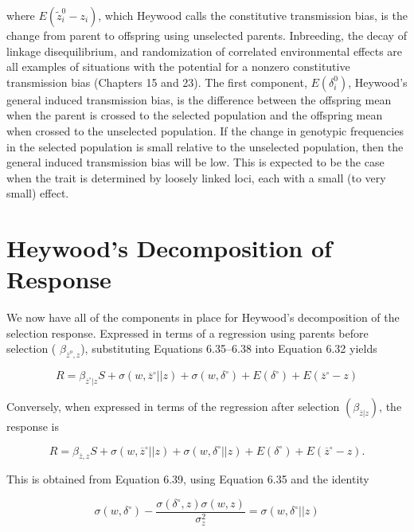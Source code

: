 \documentclass{article}
\begin{document}
where  $ E(\tilde{z}_i^0 - z_i) $, which Heywood calls the constitutive transmission bias, is the change from parent to offspring using unselected parents. Inbreeding, the decay of linkage disequilibrium, and randomization of correlated environmental effects are all examples of situations with the potential for a nonzero constitutive transmission bias (Chapters 15 and 23). The first component,  $ E(\delta_i^0) $, Heywood's general induced transmission bias, is the difference between the offspring mean when the parent is crossed to the selected population and the offspring mean when crossed to the unselected population. If the change in genotypic frequencies in the selected population is small relative to the unselected population, then the general induced transmission bias will be low. This is expected to be the case when the trait is determined by loosely linked loci, each with a small (to very small) effect.

\section{Heywood's Decomposition of Response}
We now have all of the components in place for Heywood's decomposition of the selection response. Expressed in terms of a regression using parents before selection ( $ \beta_{\overline{z}^{o},z} $), substituting Equations 6.35–6.38 into Equation 6.32 yields

\begin{equation}
R=\beta_{\overline{{z}}^{\circ}|z}S+\sigma(w,\overline{{z}}^{\circ}||z)+\sigma(w,\delta^{\circ})+E(\delta^{\circ})+E(\overline{{z}}^{\circ}-z)
\tag{6.39}
\label{eq:6_39}
\end{equation}

Conversely, when expressed in terms of the regression after selection  $ (\beta_{\overline{z}|z}) $, the response is

\begin{equation}
R=\beta_{\overline{{z}},z}S+\sigma(w,\overline{{z}}^{\circ}||z)+\sigma(w,\delta^{\circ}||z)+E(\delta^{\circ})+E(\overline{{z}}^{\circ}-z).
\tag{6.40}
\label{eq:6_40}
\end{equation}

This is obtained from Equation 6.39, using Equation 6.35 and the identity

\begin{equation}
\sigma(w,\delta^{\circ})-\frac{\sigma(\delta^{\circ},z)\sigma(w,z)}{\sigma_{z}^{2}}=\sigma(w,\delta^{\circ}||z)
\tag{6.41}
\label{eq:6_41}
\end{equation}
\end{document}
